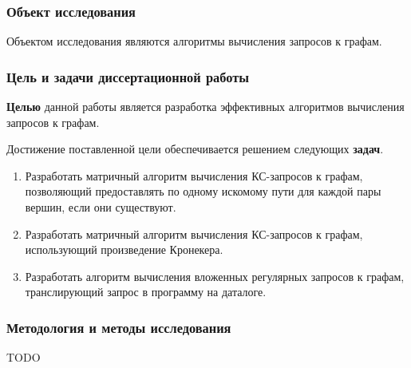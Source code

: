
\subsubsection*{\large{Объект исследования}}

 Объектом исследования являются алгоритмы вычисления запросов к графам.

\subsubsection*{\large{Цель и задачи диссертационной работы}}

\textbf{Целью} данной работы является разработка эффективных алгоритмов вычисления запросов к графам.

Достижение поставленной цели обеспечивается решением следующих \textbf{задач}.
\begin{enumerate}
	\item Разработать матричный алгоритм вычисления КС-запросов к графам, позволяющий предоставлять по одному искомому пути для каждой пары вершин, если они существуют.
	\item Разработать матричный алгоритм вычисления КС-запросов к графам, использующий произведение Кронекера.
	\item Разработать алгоритм вычисления вложенных регулярных запросов к графам, транслирующий запрос в программу на даталоге.
\end{enumerate}


\subsubsection*{\large{Методология и методы исследования}}
TODO

